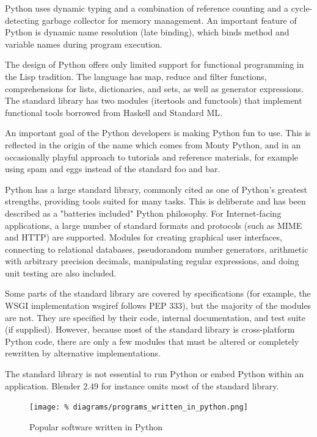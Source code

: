 Python uses dynamic typing and a combination of reference
counting and a cycle-detecting garbage collector for memory
management. An important feature of Python is dynamic name
resolution (late binding), which binds method and variable
names during program execution.\cite{amjad18}

The design of Python offers only limited support for
functional programming in the Lisp tradition. The language
has map, reduce and filter functions, comprehensions for
lists, dictionaries, and sets, as well as generator
expressions.\cite{amjad19} The standard library has two
modules (itertools and functools) that implement functional
tools borrowed from Haskell and Standard ML.\cite{amjad20}

An important goal of the Python developers is making Python
fun to use. This is reflected in the origin of the name
which comes from Monty Python, and in an occasionally
playful approach to tutorials and reference materials, for
example using spam and eggs instead of the standard foo
and bar.\cite{amjad21}

Python has a large standard library, commonly cited as one
of Python's greatest strengths, providing tools suited for
many tasks. This is deliberate and has been described as a
"batteries included" Python philosophy. For Internet-facing
applications, a large number of standard formats and
protocols (such as MIME and HTTP) are supported. Modules
for creating graphical user interfaces, connecting to
relational databases, pseudorandom number generators,
arithmetic with arbitrary precision decimals, manipulating
regular expressions, and doing unit testing are also
included.\cite{amjad21}

Some parts of the standard library are covered by
specifications (for example, the WSGI implementation
wsgiref follows PEP 333), but the majority of the modules
are not. They are specified by their code, internal
documentation, and test suite (if supplied). However,
because most of the standard library is cross-platform
Python code, there are only a few modules that must be
altered or completely rewritten by alternative
implementations.\cite{amjad21}

The standard library is not essential to run Python or
embed Python within an application. Blender 2.49 for
instance omits most of the standard library.

\begin{figure}[H]
  \centering
  \texttt{[image: \%
    diagrams/programs\_written\_in\_python.png]}
  \caption{Popular software written in Python}
\end{figure}

